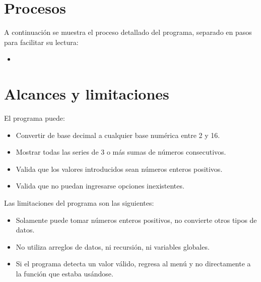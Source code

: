 \documentclass[conference]{IEEEtran}
\begin{document}
\section{Procesos}
A continuación se muestra el proceso detallado del programa, separado en pasos para facilitar su lectura:
\begin{itemize}
    \item 
\end{itemize}

\section{Alcances y limitaciones}
El programa puede:
\begin{itemize}
    \item Convertir de base decimal a cualquier base numérica entre 2 y 16.
    \item Mostrar todas las series de 3 o más sumas de números consecutivos.
    \item Valida que los valores introducidos sean números enteros positivos.
    \item Valida que no puedan ingresarse opciones inexistentes.
\end{itemize}
Las limitaciones del programa son las siguientes:
\begin{itemize}
    \item Solamente puede tomar números enteros positivos, no convierte otros tipos de datos.
    \item No utiliza arreglos de datos, ni recursión, ni variables globales. 
    \item Si el programa detecta un valor válido, regresa al menú y no directamente a la función que estaba usándose.
\end{itemize}
\end{document}
